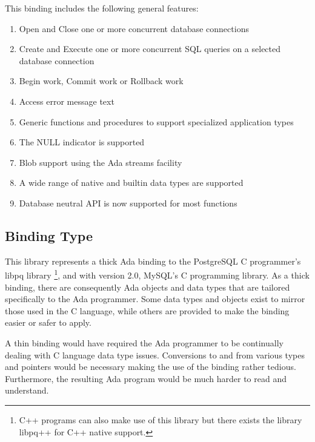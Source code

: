 \documentclass[english,letterpaper]{book}
\begin{document}
This binding includes the following general features:

\begin{enumerate}
   \item Open and Close one or more concurrent database connections
   \item Create and Execute one or more concurrent SQL queries on a selected
         database connection
   \item Begin work, Commit work or Rollback work
   \item Access error message text
   \item Generic functions and procedures to support specialized application
         types
   \item The NULL indicator is supported
   \item Blob support using the Ada streams facility
   \item A wide range of native and builtin data types are supported
   \item Database neutral API is now supported for most functions
\end{enumerate}

\subsection{Binding Type}

This library represents a thick Ada binding to the PostgreSQL C  programmer's
libpq library %
\footnote{C++ programs can also make use of this library but there exists the
library libpq++ for C++ native support.%
}, and with version 2.0, MySQL's C programming library. As a thick
binding, there are consequently Ada objects and data types that are
tailored specifically to the Ada programmer. Some data types and objects
exist to mirror those used in the C language, while others are provided
to make the binding easier or safer to apply.

A thin binding would have required the Ada programmer to be continually
dealing with C language data type issues. Conversions to and from
various types and pointers would be necessary making the use of the
binding rather tedious. Furthermore, the resulting Ada program would
be much harder to read and understand.
\end{document}

